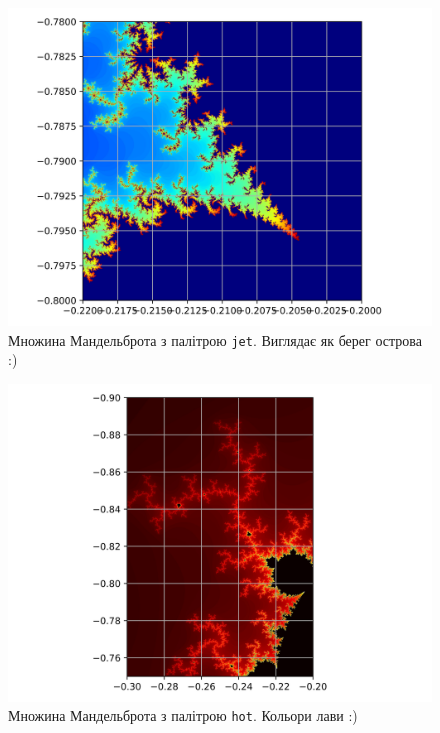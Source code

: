 \documentclass[oneside,solution]{tmpl}
\begin{document}
\begin{figure}
    \centering
    \includegraphics[width=\textwidth]{images/hw_10/mandelbrot_2.jpg}
    \caption{Множина Мандельброта з палітрою \texttt{jet}. Виглядає як берег острова :)}
    \label{fig:3}
\end{figure}

\begin{figure}
    \centering
    \includegraphics[width=\textwidth]{images/hw_10/mandelbrot_3.jpg}
    \caption{Множина Мандельброта з палітрою \texttt{hot}. Кольори лави :)}
    \label{fig:3}
\end{figure}
\end{document}
